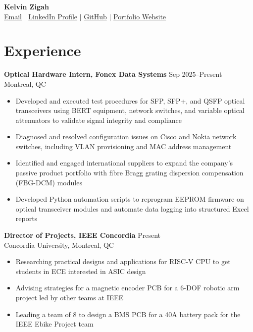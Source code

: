 \documentclass[10pt]{article}
\begin{document}
\begin{center}
    {\LARGE\bfseries Kelvin Zigah} \\[0.15cm]
    \href{mailto:kzeezigah@gmail.com}{Email} $\mid$
    \href{https://www.linkedin.com/in/kelvinzigah/}{LinkedIn Profile} $\mid$
    \href{https://github.com/kelvinzigah}{GitHub}   $\mid$
    \href{https://kelvinzigah.github.io/}
    {Portfolio Website}
\end{center}

\section*{Experience}
\textbf{Optical Hardware Intern, Fonex Data Systems} \hfill Sep 2025--Present \\
Montreal, QC
\begin{itemize}
    \item Developed and executed test procedures for SFP, SFP+, and QSFP optical transceivers using BERT equipment, network switches, and variable optical attenuators to validate signal integrity and compliance
    \item Diagnosed and resolved configuration issues on Cisco and Nokia network switches, including VLAN provisioning and MAC address management
    \item Identified and engaged international suppliers to expand the company's passive product portfolio with fibre Bragg grating dispersion compensation (FBG-DCM) modules
    \item Developed Python automation scripts to reprogram EEPROM firmware on optical transceiver modules and automate data logging into structured Excel reports
\end{itemize}

\textbf{Director of Projects, IEEE Concordia} \hfill Present \\
Concordia University, Montreal, QC
\begin{itemize}
    \item Researching practical designs and applications for RISC-V CPU to get students in ECE interested in ASIC design
    \item Advising strategies for a magnetic encoder PCB for a 6-DOF robotic arm project led by other teams at IEEE
    \item Leading a team of 8 to design a BMS PCB for a 40A battery pack for the IEEE Ebike Project team
\end{itemize}
\end{document}
